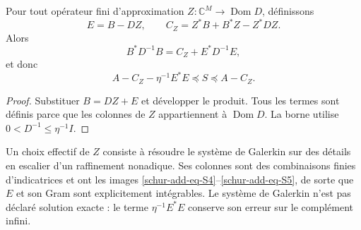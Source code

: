 \begin{theorem}
\label{schur-add-residual}
Pour tout opérateur fini d'approximation \(Z:\mathbb C^M\to\operatorname{Dom}D\), définissons
\begin{equation}
E=B-DZ,\qquad C_Z=Z^*B+B^*Z-Z^*DZ.
\label{schur-add-display-15}
\end{equation}
Alors
\begin{equation}
B^*D^{-1}B=C_Z+E^*D^{-1}E,
\label{schur-add-display-16}
\end{equation}
et donc
\begin{equation}
\boxed{A-C_Z-\eta^{-1}E^*E\preceq S\preceq A-C_Z.}
\label{schur-add-eq-S7}
\end{equation}
\end{theorem}
\begin{proof}
Substituer \(B=DZ+E\) et développer le produit. Tous les
termes sont définis parce que les colonnes de \(Z\) appartiennent à
\(\operatorname{Dom}D\). La borne utilise \(0<D^{-1}\leq\eta^{-1}I\).
\end{proof}

Un choix effectif de \(Z\) consiste à résoudre le système de Galerkin sur des détails en escalier d'un raffinement nonadique. Ses colonnes sont des combinaisons finies d'indicatrices et ont les images \eqref{schur-add-eq-S4}--\eqref{schur-add-eq-S5}, de sorte que \(E\) et son Gram sont explicitement intégrables. Le système de Galerkin n'est pas déclaré solution exacte : le terme \(\eta^{-1}E^*E\) conserve son erreur sur le complément infini.

